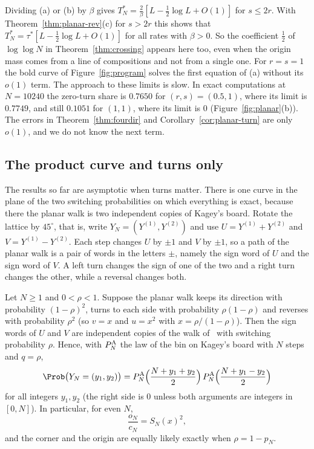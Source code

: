 Dividing (a) or (b) by $\beta$ gives $T^*_N=\frac2\beta[L-\frac12\log L+O(1)]$ for $s\le2r$. With
Theorem~\ref{thm:planar-rev}(c) for $s>2r$ this shows that
$T^*_N=\tau^*[L-\frac12\log L+O(1)]$ for all rates with $\beta>0$. So the coefficient $\frac12$ of $\log\log N$ in Theorem~\ref{thm:crossing} appears
here too, even when the origin mass comes from a line of compositions and not from a single one.
For $r=s=1$ the bold curve of Figure~\ref{fig:program} solves the first equation of (a) without its
$o(1)$ term. The approach to these limits is slow. In exact computations at $N=10240$ the zero-turn share is $0.7650$ for
$(r,s)=(0.5,1)$, where its limit is $0.7749$, and still $0.1051$ for $(1,1)$, where its limit is $0$
(Figure~\ref{fig:planar}(b)). The errors in Theorem~\ref{thm:fourdir} and
Corollary~\ref{cor:planar-turn} are only $o(1)$, and we do not know the next term.

\subsection{The product curve and turns only}\label{sec:product}

The results so far are asymptotic when turns matter. There is one curve in the plane of the two
switching probabilities on which everything is exact, because there the planar walk is two
independent copies of Kagey's board. Rotate the lattice by $45^\circ$, that is, write
$Y_N=(Y^{(1)},Y^{(2)})$ and use $U=Y^{(1)}+Y^{(2)}$ and $V=Y^{(1)}-Y^{(2)}$. Each step changes $U$ by
$\pm1$ and $V$ by $\pm1$, so a path of the planar walk is a pair of words in the letters $\pm$,
namely the sign word of $U$ and the sign word of $V$. A left turn changes the sign of one of the two
and a right turn changes the other, while a reversal changes both.

\begin{proposition}\label{prop:product}
Let $N\ge1$ and $0<\rho<1$. Suppose the planar walk keeps its direction with probability
$(1-\rho)^2$, turns to each side with probability $\rho(1-\rho)$ and reverses with probability
$\rho^2$ (so $v=x$ and $u=x^2$ with $x=\rho/(1-\rho)$). Then the sign words of $U$ and $V$ are
independent copies of the walk of~\cite{paperA} with switching probability $\rho$. Hence, with
$P^{\rm A}_N$ the law of the bin on Kagey's board with $N$ steps and $q=\rho$,
\[
 \Prob\bigl(Y_N=(y_1,y_2)\bigr)
 =P^{\rm A}_N\Bigl(\frac{N+y_1+y_2}2\Bigr)\,P^{\rm A}_N\Bigl(\frac{N+y_1-y_2}2\Bigr)
\]
for all integers $y_1,y_2$ (the right side is $0$ unless both arguments are integers in $[0,N]$).
In particular, for even $N$,
\[
 \frac{o_N}{c_N}=S_N(x)^2,
\]
and the corner and the origin are equally likely exactly when $\rho=1-p_N$.
\end{proposition}

